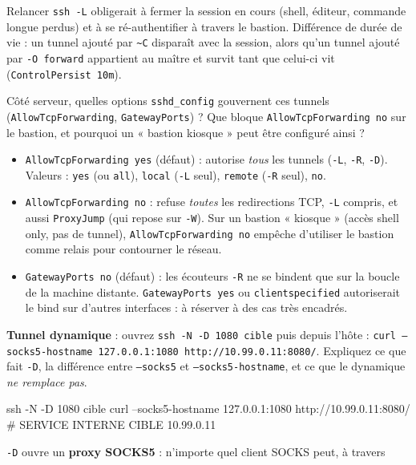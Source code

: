 \documentclass[a4paper,10pt]{exam}
\begin{document}
\begin{questions}
\begin{solution}
Relancer \texttt{ssh -L} obligerait à fermer la session en cours (shell, éditeur, commande
longue perdus) et à se ré-authentifier à travers le bastion. Différence de durée de vie :
un tunnel ajouté par \texttt{\textasciitilde C} disparaît avec la session, alors qu'un
tunnel ajouté par \texttt{-O forward} appartient au maître et survit tant que celui-ci
vit (\texttt{ControlPersist 10m}).
\end{solution}
\question Côté serveur, quelles options \texttt{sshd\_config} gouvernent ces tunnels
(\texttt{AllowTcpForwarding}, \texttt{GatewayPorts}) ? Que bloque
\texttt{AllowTcpForwarding no} sur le bastion, et pourquoi un « bastion kiosque » peut
être configuré ainsi ?
\begin{solution}
\begin{itemize}
  \item \texttt{AllowTcpForwarding yes} (défaut) : autorise \emph{tous} les tunnels
        (\texttt{-L}, \texttt{-R}, \texttt{-D}). Valeurs : \texttt{yes} (ou \texttt{all}),
        \texttt{local} (\texttt{-L} seul), \texttt{remote} (\texttt{-R} seul), \texttt{no}.
  \item \texttt{AllowTcpForwarding no} : refuse \emph{toutes} les redirections TCP,
        \texttt{-L} compris, et aussi \texttt{ProxyJump} (qui repose sur \texttt{-W}).
        Sur un bastion « kiosque » (accès shell only, pas de tunnel),
        \texttt{AllowTcpForwarding no} empêche d'utiliser le bastion comme relais pour
        contourner le réseau.
  \item \texttt{GatewayPorts no} (défaut) : les écouteurs \texttt{-R} ne se bindent que sur
        la boucle de la machine distante. \texttt{GatewayPorts yes} ou
        \texttt{clientspecified} autoriserait le bind sur d'autres interfaces : à réserver
        à des cas très encadrés.
\end{itemize}
\end{solution}
\question \textbf{Tunnel dynamique} : ouvrez \texttt{ssh -N -D 1080 cible} puis depuis
l'hôte : \texttt{curl --socks5-hostname 127.0.0.1:1080
http://10.99.0.11:8080/}. Expliquez ce que fait \texttt{-D}, la différence entre
\texttt{--socks5} et \texttt{--socks5-hostname}, et ce que le dynamique \emph{ne remplace
pas}.
\begin{solution}
\begin{bashcode}
ssh -N -D 1080 cible
curl --socks5-hostname 127.0.0.1:1080 http://10.99.0.11:8080/
# SERVICE INTERNE CIBLE 10.99.0.11
\end{bashcode}
\texttt{-D} ouvre un \textbf{proxy SOCKS5} : n'importe quel client SOCKS peut, à travers

\end{solution}
\end{questions}
\end{document}
